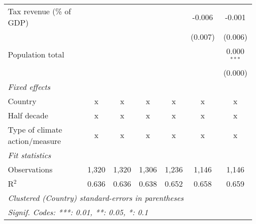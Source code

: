 \begin{tabular}{lcccccc}
   Tax revenue (\% of GDP)              &              &               &               &               & -0.006       & -0.001\\   
                                        &              &               &               &               & (0.007)      & (0.006)\\   
   Population total                     &              &               &               &               &              & 0.000$^{***}$\\   
                                        &              &               &               &               &              & (0.000)\\   
   \emph{Fixed effects}\\
   Country                              & x            & x             & x             & x             & x            & x\\  
   Half decade                          & x            & x             & x             & x             & x            & x\\  
   Type of climate action/measure       & x            & x             & x             & x             & x            & x\\  
   \midrule \emph{Fit statistics}\\
   Observations                         & 1,320        & 1,320         & 1,306         & 1,236         & 1,146        & 1,146\\  
   R$^2$                                & 0.636        & 0.636         & 0.638         & 0.652         & 0.658        & 0.659\\  
   \midrule
   \multicolumn{7}{l}{\emph{Clustered (Country) standard-errors in parentheses}}\\
   \multicolumn{7}{l}{\emph{Signif. Codes: ***: 0.01, **: 0.05, *: 0.1}}\\
\end{tabular}
\par\endgroup


